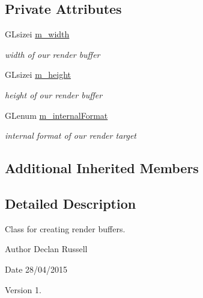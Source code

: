 \subsection*{Private Attributes}
\begin{DoxyCompactItemize}
\item 
\hypertarget{class_render_buffer_a897cca2ee9529f82447fee545354135f}{G\-Lsizei \hyperlink{class_render_buffer_a897cca2ee9529f82447fee545354135f}{m\-\_\-width}}\label{class_render_buffer_a897cca2ee9529f82447fee545354135f}

\begin{DoxyCompactList}\small\item\em width of our render buffer \end{DoxyCompactList}\item 
\hypertarget{class_render_buffer_a747f5fc28706771541141a6a581031dc}{G\-Lsizei \hyperlink{class_render_buffer_a747f5fc28706771541141a6a581031dc}{m\-\_\-height}}\label{class_render_buffer_a747f5fc28706771541141a6a581031dc}

\begin{DoxyCompactList}\small\item\em height of our render buffer \end{DoxyCompactList}\item 
\hypertarget{class_render_buffer_a07f819fc22c10d7aea614d9aef443c72}{G\-Lenum \hyperlink{class_render_buffer_a07f819fc22c10d7aea614d9aef443c72}{m\-\_\-internal\-Format}}\label{class_render_buffer_a07f819fc22c10d7aea614d9aef443c72}

\begin{DoxyCompactList}\small\item\em internal format of our render target \end{DoxyCompactList}\end{DoxyCompactItemize}
\subsection*{Additional Inherited Members}


\subsection{Detailed Description}
Class for creating render buffers. 

\begin{DoxyAuthor}{Author}
Declan Russell 
\end{DoxyAuthor}
\begin{DoxyDate}{Date}
28/04/2015 
\end{DoxyDate}
\begin{DoxyVersion}{Version}
1. 
\end{DoxyVersion}


